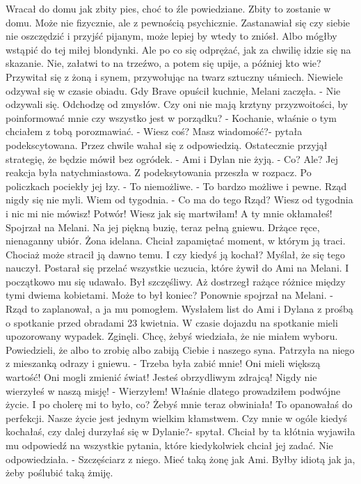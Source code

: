 \documentclass[12pt,a4paper]{book}
\begin{document}
Wracał do domu jak zbity pies, choć to źle powiedziane. Zbity to zostanie w domu. Może nie fizycznie, ale z pewnością psychicznie. Zastanawiał się czy siebie nie oszczędzić i przyjść pijanym, może lepiej by wtedy to zniósł. Albo mógłby wstąpić do tej miłej blondynki. Ale po co się odprężać, jak za chwilię idzie się na skazanie. Nie, załatwi to na trzeźwo, a potem się upije, a później kto wie?
Przywitał się z żoną i synem, przywołując na twarz sztuczny uśmiech. Niewiele odzywał się w czasie obiadu. Gdy Brave opuścił kuchnie, Melani zaczęła.
- Nie odzywali się. Odchodzę od zmysłów. Czy oni nie mają krztyny przyzwoitości, by poinformować mnie czy wszystko jest w porządku? 
- Kochanie, właśnie o tym chciałem z tobą porozmawiać. 
- Wiesz coś? Masz wiadomość?- pytała podekscytowana. 
Przez chwile wahał się z odpowiedzią. Ostatecznie przyjął strategię, że będzie mówił bez ogródek. 
- Ami i Dylan nie żyją. 
- Co? Ale?
Jej reakcja była natychmiastowa. Z podeksytowania przeszła w rozpacz. Po policzkach pociekły jej łzy. 
- To niemożliwe. 
- To bardzo możliwe i pewne. Rząd nigdy się nie myli. Wiem od tygodnia. 
- Co ma do tego Rząd? Wiesz od tygodnia i nic mi nie mówisz! Potwór! Wiesz jak się martwiłam! A ty mnie okłamałeś!
Spojrzał na Melani. Na jej piękną buzię, teraz pełną gniewu. Drżące ręce, nienaganny ubiór. Żona idelana. 
Chciał zapamiętać moment, w którym ją traci. Chociaż może stracił ją dawno temu. I czy kiedyś ją kochał? Myślał, że się tego nauczył. Postarał się przelać wszystkie uczucia, które żywił do Ami na Melani. I początkowo mu się udawało. Był szczęśliwy. Aż dostrzegł rażące różnice między tymi dwiema kobietami. Może to był koniec?
Ponownie spojrzał na Melani. 
- Rząd to zaplanował, a ja mu pomogłem. Wysłałem list do Ami i Dylana z prośbą o spotkanie przed obradami 23 kwietnia. W czasie dojazdu na spotkanie mieli upozorowany wypadek. Zginęli. Chcę, żebyś wiedziała, że nie miałem wyboru. Powiedzieli, że albo to zrobię albo zabiją Ciebie i naszego syna. 
Patrzyła na niego z mieszanką odrazy i gniewu. 
- Trzeba była zabić mnie! Oni mieli większą wartość! Oni mogli zmienić świat! Jesteś obrzydliwym zdrajcą! Nigdy nie wierzyłeś w naszą misję!
- Wierzyłem! Właśnie dlatego prowadziłem podwójne życie. I po cholerę mi to było, co? Żebyś mnie teraz obwiniała! To opanowałaś do perfekcji. Nasze życie jest jednym wielkim kłamstwem. Czy mnie w ogóle kiedyś kochałaś, czy dalej durzyłaś się w Dylanie?- spytał. 
Chciał by ta kłótnia wyjawiła mu odpowiedź na wszystkie pytania, które kiedykolwiek chciał jej zadać. 
Nie odpowiedziała.
- Szczęściarz z niego. Mieć taką żonę jak Ami. Byłby idiotą jak ja, żeby poślubić taką żmiję.
\end{document}
